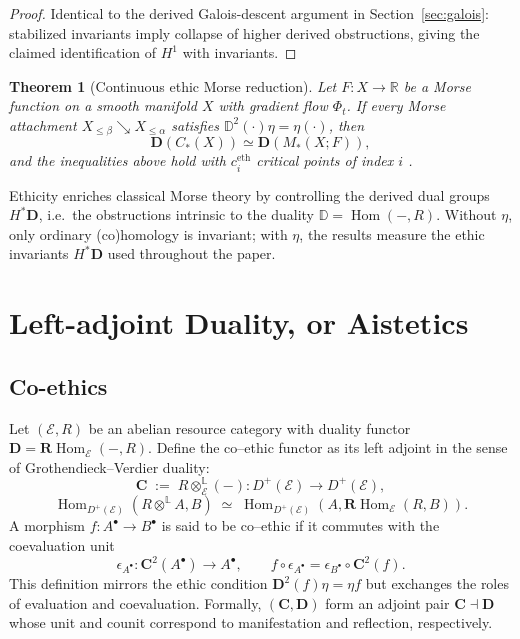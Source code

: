 \documentclass[12pt]{article}
\newcommand{\RR}{\mathbb{R}}
\newcommand{\E}{\mathcal{E}}
\newcommand{\DD}{\mathbb{D}}
\newcommand{\Hom}{\operatorname{Hom}}
\newcommand{\RHom}{\mathbf{R}\!\operatorname{Hom}}
\theoremstyle{plain}
\newtheorem{theorem}{Theorem}[section]
\theoremstyle{definition}
\theoremstyle{remark}
\numberwithin{equation}{section}
\begin{document}
\begin{proof}
Identical to the derived Galois-descent argument in Section~\ref{sec:galois}: stabilized invariants imply collapse of higher derived obstructions, giving the claimed identification of \(H^1\) with invariants.
\end{proof}

\begin{theorem}[Continuous ethic Morse reduction]
Let \(F:X\to\RR\) be a Morse function on a smooth manifold \(X\) with gradient flow \(\Phi_t\).
If every Morse attachment \(X_{\le\beta}\searrow X_{\le\alpha}\) satisfies \(\DD^2(\cdot)\eta=\eta(\cdot)\),
then
\[
\mathbf D(C_\ast(X))\simeq \mathbf D(M_\ast(X;F)),
\]
and the inequalities above hold with \(c_i^{\mathrm{eth}}\) critical points of index \(i\) \cite{Milnor1963}.
\end{theorem}

Ethicity enriches classical Morse theory by controlling the derived dual groups \(H^\ast\mathbf D\), i.e.\ the obstructions intrinsic to the duality \(\DD=\Hom(-,R)\).  Without \(\eta\), only ordinary (co)homology is invariant; with \(\eta\), the results measure the ethic invariants \(H^\ast\mathbf D\) used throughout the paper.

\section{Left-adjoint Duality, or Aistetics}

\subsection{Co-ethics}

Let $(\E,R)$ be an abelian resource category
with duality functor $\mathbf D=\RHom_\E(-,R)$.
Define the co--ethic functor as its left adjoint
in the sense of Grothendieck--Verdier duality:
\[
\mathbf C \;:=\; R\!\otimes^{\mathbb L}_\E (-): D^+(\E) \longrightarrow D^+(\E),
\]
\[
\Hom_{D^+(\E)}(R\!\otimes^{\mathbb L}\!A,B)
\;\simeq\;
\Hom_{D^+(\E)}(A,\RHom_\E(R,B)).
\]
A morphism $f:A^\bullet\to B^\bullet$ is said to be co--ethic if it
commutes with the coevaluation unit
\[
\epsilon_{A^\bullet}: \mathbf C^2(A^\bullet) \longrightarrow A^\bullet,
\qquad
f\circ\epsilon_{A^\bullet}=\epsilon_{B^\bullet}\circ \mathbf C^2(f).
\]
This definition mirrors the ethic condition
$\mathbf D^2(f)\eta=\eta f$ but exchanges the roles of evaluation and
coevaluation.
Formally, $(\mathbf C,\mathbf D)$ form an adjoint pair
$\mathbf C\dashv\mathbf D$ whose unit and counit correspond to
manifestation and reflection, respectively.
\end{document}
